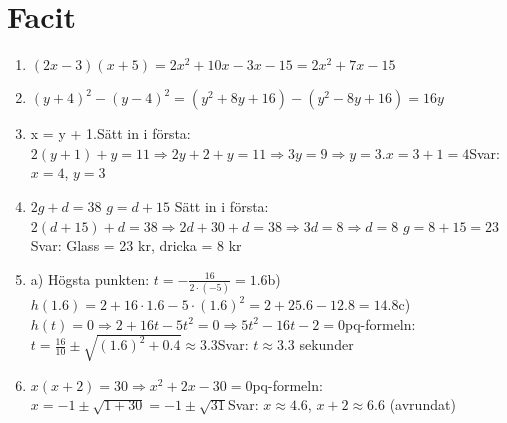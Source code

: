 \documentclass[a4paper,11pt]{article}
\begin{document}
\section*{Facit}
\begin{enumerate}[label=\textbf{\arabic*.}]
    \item $(2x - 3)(x + 5) = 2x^2 + 10x - 3x - 15 = 2x^2 + 7x - 15$
    \item $(y + 4)^2 - (y - 4)^2 = (y^2 + 8y + 16) - (y^2 - 8y + 16) = 16y$
    \item {} x = y + 1.\newline Sätt in i första: $2(y + 1) + y = 11 \Rightarrow 2y + 2 + y = 11 \Rightarrow 3y = 9 \Rightarrow y = 3$.\newline $x = 3 + 1 = 4$\newline Svar: $x=4$, $y=3$
    \item {}\newline
    $2g + d = 38$\newline
    $g = d + 15$\newline
    Sätt in i första: $2(d+15) + d = 38 \Rightarrow 2d + 30 + d = 38 \Rightarrow 3d = 8 \Rightarrow d = 8$\newline
    $g = 8 + 15 = 23$\newline
    Svar: Glass = 23 kr, dricka = 8 kr
    \item a) Högsta punkten: $t = -\frac{16}{2\cdot(-5)} = 1.6$\newline b) $h(1.6) = 2 + 16 \cdot 1.6 - 5 \cdot (1.6)^2 = 2 + 25.6 - 12.8 = 14.8$\newline c) $h(t) = 0 \Rightarrow 2 + 16t - 5t^2 = 0 \Rightarrow 5t^2 - 16t - 2 = 0$\newline pq-formeln: $t = \frac{16}{10} \pm \sqrt{(1.6)^2 + 0.4} \approx 3.3$\newline Svar: $t \approx 3.3$ sekunder
    \item $x(x+2) = 30 \Rightarrow x^2 + 2x - 30 = 0$\newline pq-formeln: $x = -1 \pm \sqrt{1 + 30} = -1 \pm \sqrt{31}$\newline Svar: $x \approx 4.6$, $x+2 \approx 6.6$ (avrundat)

\end{enumerate}
\end{document}
